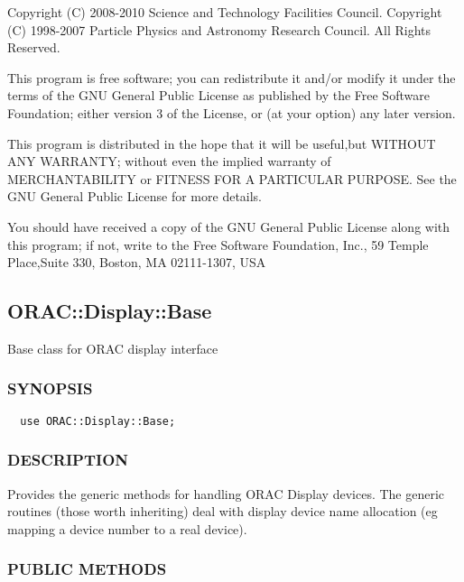Copyright (C) 2008-2010 Science and Technology Facilities Council.
Copyright (C) 1998-2007 Particle Physics and Astronomy Research
Council. All Rights Reserved.



This program is free software; you can redistribute it and/or modify it under
the terms of the GNU General Public License as published by the Free Software
Foundation; either version 3 of the License, or (at your option) any later
version.



This program is distributed in the hope that it will be useful,but WITHOUT ANY
WARRANTY; without even the implied warranty of MERCHANTABILITY or FITNESS FOR A
PARTICULAR PURPOSE. See the GNU General Public License for more details.



You should have received a copy of the GNU General Public License along with
this program; if not, write to the Free Software Foundation, Inc., 59 Temple
Place,Suite 330, Boston, MA  02111-1307, USA

\subsection{ORAC::Display::Base\label{ORAC::Display::Base}}


Base class for ORAC display interface

\subsubsection*{SYNOPSIS\label{ORAC::Display::Base_SYNOPSIS}}
\begin{verbatim}
  use ORAC::Display::Base;
\end{verbatim}
\subsubsection*{DESCRIPTION\label{ORAC::Display::Base_DESCRIPTION}}


Provides the generic methods for handling ORAC Display devices.
The generic routines (those worth inheriting) deal with display
device name allocation (eg mapping a device number to a real device).

\subsubsection*{PUBLIC METHODS\label{ORAC::Display::Base_PUBLIC_METHODS}}
